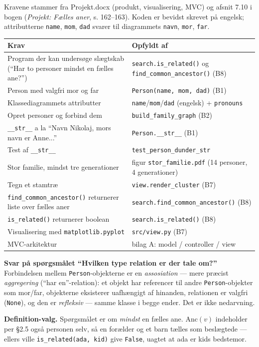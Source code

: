 \documentclass[12pt, a4paper]{article}
\begin{document}
Kravene stammer fra Projekt.docx (produkt, visualisering, MVC) og afsnit 7.10 i
bogen (\emph{Projekt: Fælles aner}, s. 162--163). Koden er bevidst skrevet på
engelsk; attributterne \texttt{name}, \texttt{mom}, \texttt{dad} svarer til
diagrammets \texttt{navn}, \texttt{mor}, \texttt{far}.

\begin{center}\footnotesize
\begin{tabular}{@{}p{}p{}@{}}
\toprule
\textbf{Krav} & \textbf{Opfyldt af} \\
\midrule
Program der kan undersøge slægtskab (``Har to personer mindst en fælles ane?'')
  & \texttt{search.is\_related()} og \texttt{find\_common\_ancestor()} (B8) \\
Person med valgfri mor og far
  & \texttt{Person(name, mom, dad)} (B1) \\
Klassediagrammets attributter
  & \texttt{name}/\texttt{mom}/\texttt{dad} (engelsk) + \texttt{pronouns} \\
Opret personer og forbind dem
  & \texttt{build\_family\_graph} (B2) \\
\texttt{\_\_str\_\_} a la ``Navn Nikolaj, mors navn er Anne...''
  & \texttt{Person.\_\_str\_\_} (B1) \\
Test af \texttt{\_\_str\_\_}
  & \texttt{test\_person\_dunder\_str} \\
Stor familie, mindst tre generationer
  & figur \texttt{stor\_familie.pdf} (14 personer, 4 generationer) \\
Tegn et stamtræ
  & \texttt{view.render\_cluster} (B7) \\
\texttt{find\_common\_ancestor()} returnerer liste over fælles aner
  & \texttt{search.find\_common\_ancestor()} (B8) \\
\texttt{is\_related()} returnerer boolean
  & \texttt{search.is\_related()} (B8) \\
Visualisering med \texttt{matplotlib.pyplot}
  & \texttt{src/view.py} (B7) \\
MVC-arkitektur
  & bilag A: model / controller / view \\
\bottomrule
\end{tabular}
\end{center}

\bigskip
\noindent\textbf{Svar på spørgsmålet ``Hvilken type relation er der tale om?''}
Forbindelsen mellem \texttt{Person}-objekterne er en \emph{assosiation} ---
mere præcist \emph{aggregering} (``har en''-relation): et objekt har referencer
til andre \texttt{Person}-objekter som mor/far, objekterne eksisterer uafhængigt
af hinanden, relationen er valgfri (\texttt{None}), og den er \emph{refleksiv}
--- samme klasse i begge ender. Det er ikke nedarvning.

\bigskip
\noindent\textbf{Definition-valg.} Spørgsmålet er om \emph{mindst} en fælles
ane. $\mathrm{Anc}(v)$ indeholder per \S 2.5 også personen selv, så en forælder
og et barn tælles som beslægtede --- ellers ville \texttt{is\_related(ada, kid)}
give \texttt{False}, uagtet at ada er kids bedstemor.
\end{document}
